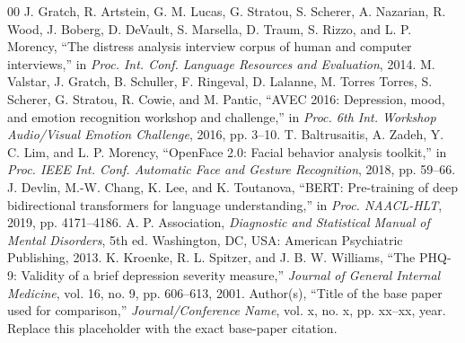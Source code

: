 \documentclass[conference]{IEEEtran}
\begin{document}
\begin{thebibliography}{00}
 J. Gratch, R. Artstein, G. M. Lucas, G. Stratou, S. Scherer, A. Nazarian, R. Wood, J. Boberg, D. DeVault, S. Marsella, D. Traum, S. Rizzo, and L. P. Morency, ``The distress analysis interview corpus of human and computer interviews,'' in \textit{Proc. Int. Conf. Language Resources and Evaluation}, 2014.
 M. Valstar, J. Gratch, B. Schuller, F. Ringeval, D. Lalanne, M. Torres Torres, S. Scherer, G. Stratou, R. Cowie, and M. Pantic, ``AVEC 2016: Depression, mood, and emotion recognition workshop and challenge,'' in \textit{Proc. 6th Int. Workshop Audio/Visual Emotion Challenge}, 2016, pp. 3--10.
 T. Baltrusaitis, A. Zadeh, Y. C. Lim, and L. P. Morency, ``OpenFace 2.0: Facial behavior analysis toolkit,'' in \textit{Proc. IEEE Int. Conf. Automatic Face and Gesture Recognition}, 2018, pp. 59--66.
 J. Devlin, M.-W. Chang, K. Lee, and K. Toutanova, ``BERT: Pre-training of deep bidirectional transformers for language understanding,'' in \textit{Proc. NAACL-HLT}, 2019, pp. 4171--4186.
 A. P. Association, \textit{Diagnostic and Statistical Manual of Mental Disorders}, 5th ed. Washington, DC, USA: American Psychiatric Publishing, 2013.
 K. Kroenke, R. L. Spitzer, and J. B. W. Williams, ``The PHQ-9: Validity of a brief depression severity measure,'' \textit{Journal of General Internal Medicine}, vol. 16, no. 9, pp. 606--613, 2001.
 Author(s), ``Title of the base paper used for comparison,'' \textit{Journal/Conference Name}, vol. x, no. x, pp. xx--xx, year. Replace this placeholder with the exact base-paper citation.
\end{thebibliography}
\end{document}
